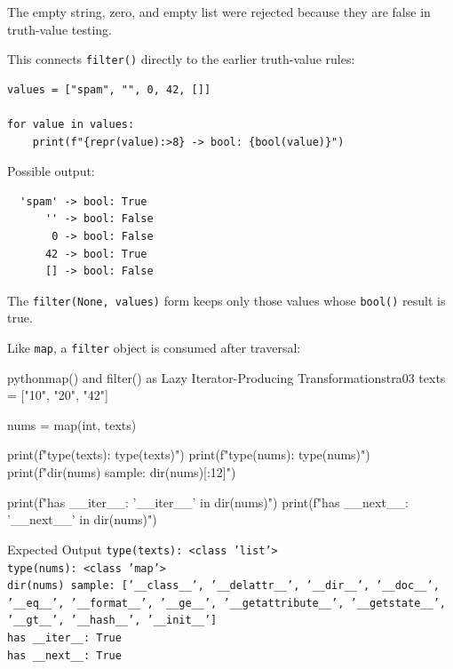 \documentclass[a4paper,twoside]{report}
\begin{document}
The empty string, zero, and empty list were rejected because they are false in truth-value testing.

This connects \texttt{filter()} directly to the earlier truth-value rules:

\begin{verbatim}
values = ["spam", "", 0, 42, []]

for value in values:
    print(f"{repr(value):>8} -> bool: {bool(value)}")
\end{verbatim}

Possible output:

\begin{verbatim}
  'spam' -> bool: True
      '' -> bool: False
       0 -> bool: False
      42 -> bool: True
      [] -> bool: False
\end{verbatim}

The \texttt{filter(None, values)} form keeps only those values whose \texttt{bool()} result is true.

Like \texttt{map}, a \texttt{filter} object is consumed after traversal:

\begin{codebox}[]{python}{map() and filter() as Lazy Iterator-Producing Transformations}{tra03}
texts = ["10", "20", "42"]

nums = map(int, texts)

print(f"type(texts): {type(texts)}")
print(f"type(nums): {type(nums)}")
print(f"dir(nums) sample: {dir(nums)[:12]}")

print(f"has __iter__: {'__iter__' in dir(nums)}")
print(f"has __next__: {'__next__' in dir(nums)}")
\end{codebox}


\begin{iobox}{Expected Output}
\texttt{type(texts): <class 'list'>} \\
\texttt{type(nums): <class 'map'>} \\
\texttt{dir(nums) sample: ['\_\_class\_\_', '\_\_delattr\_\_', '\_\_dir\_\_', '\_\_doc\_\_',} \\
\texttt{'\_\_eq\_\_', '\_\_format\_\_', '\_\_ge\_\_', '\_\_getattribute\_\_', '\_\_getstate\_\_',} \\
\texttt{'\_\_gt\_\_', '\_\_hash\_\_', '\_\_init\_\_']} \\
\texttt{has \_\_iter\_\_: True} \\
\texttt{has \_\_next\_\_: True} \\
\end{iobox}
\end{document}
